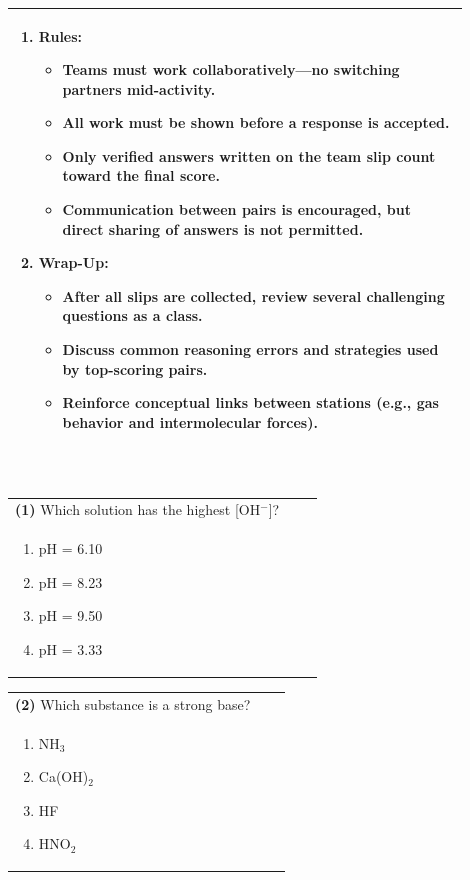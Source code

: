 \documentclass{article}
\begin{document}
\begin{tabular}{|p{0.9\linewidth}|}
\begin{enumerate}
    \item \textbf{Rules:}
    \begin{itemize}
        \item Teams must work collaboratively—no switching partners mid-activity.
        \item All work must be shown before a response is accepted.
        \item Only verified answers written on the team slip count toward the final score.
        \item Communication between pairs is encouraged, but direct sharing of answers is not permitted.
    \end{itemize}

    \item \textbf{Wrap-Up:}
    \begin{itemize}
        \item After all slips are collected, review several challenging questions as a class.
        \item Discuss common reasoning errors and strategies used by top-scoring pairs.
        \item Reinforce conceptual links between stations (e.g., gas behavior and intermolecular forces).
    \end{itemize}
\end{enumerate}
\\
\hline
\end{tabular}
\newpage
{}\\[0.2em]
\vspace{0.2cm}
\noindent\begin{tabular}{|p{0.9\linewidth}|}
\hline
\textbf{(1)} Which solution has the highest [OH$^-$]? \\[0.2cm]
\begin{minipage}{0.85\linewidth}
\begin{enumerate}[label=\alph*.]
\item pH = 6.10 \item pH = 8.23 \item pH = 9.50 \item pH = 3.33
\end{enumerate}
\end{minipage}\\[0.2cm]
\hline
\end{tabular}

\noindent\begin{tabular}{|p{0.9\linewidth}|}
\hline
\textbf{(2)} Which substance is a strong base? \\[0.2cm]
\begin{minipage}[t]{0.85\linewidth}
\begin{enumerate}[label=\alph*.]
\item NH$_3$ \item Ca(OH)$_2$ \item HF \item HNO$_2$
\end{enumerate}
\end{minipage}\\[0.2cm]
\hline
\end{tabular}
\end{document}
